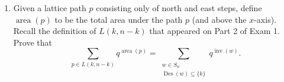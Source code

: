 \documentclass[11pt]{article}%
\theoremstyle{definition}
\DeclareMathOperator{\inv}{inv}
\DeclareMathOperator{\area}{area}
\DeclareMathOperator{\Des}{Des}
\begin{document}
\begin{enumerate}
\item Given a lattice path $p$ consisting only of north and east steps, define $\area(p)$ to be the total area under the path $p$ (and above the $x$-axis). Recall the definition of $L(k,n-k)$ that appeared on Part 2 of Exam 1. Prove that
\[
\sum_{p\in L(k,n-k)}q^{\area(p)}=\sum_{\substack{w\in S_n \\ \Des(w)\subseteq \{k\}}} q^{\inv(w)}.
\]

\end{enumerate}
\end{document}
